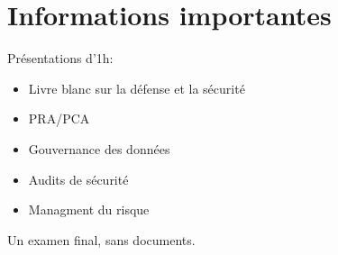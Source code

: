 \section{Informations importantes}
Pr\'esentations d'1h:
\begin{itemize}
  \item Livre blanc sur la d\'efense et la s\'ecurit\'e
  \item PRA/PCA
  \item Gouvernance des donn\'ees
  \item Audits de s\'ecurit\'e
  \item Managment du risque
\end{itemize}
Un examen final, sans documents.
